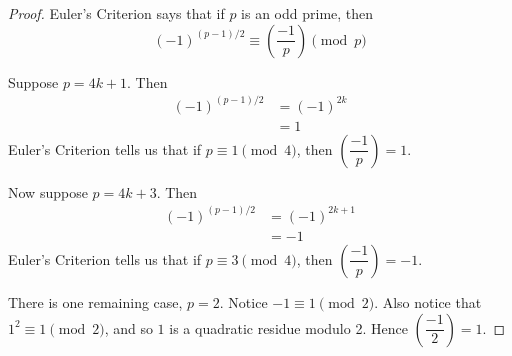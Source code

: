 \begin{proof}
Euler's Criterion says that if $p$ is an odd prime, then
\[ (-1)^{(p-1)/2} \equiv \left( \dfrac{-1}{p} \right) \pmod{p} \]

Suppose $p = 4k + 1$. Then
\begin{align*}
	(-1)^{(p-1)/2} &= (-1)^{2k} \\
				   &= 1
\end{align*}
Euler's Criterion tells us that if $p \equiv 1 \pmod{4}$, then 
$\left( \dfrac{-1}{p} \right) = 1$.

Now suppose $p = 4k + 3$. Then
\begin{align*}
	(-1)^{(p-1)/2} &= (-1)^{2k+1} \\
				   &= -1
\end{align*}
Euler's Criterion tells us that if $p \equiv 3 \pmod{4}$, then
$\left( \dfrac{-1}{p} \right) = -1$.

There is one remaining case, $p=2$. Notice $-1 \equiv 1 \pmod 2$. Also notice
that $1^2 \equiv 1 \pmod 2$, and so $1$ is a quadratic residue modulo 2. Hence
$\left( \dfrac{-1}{2} \right) = 1$.
\end{proof}


